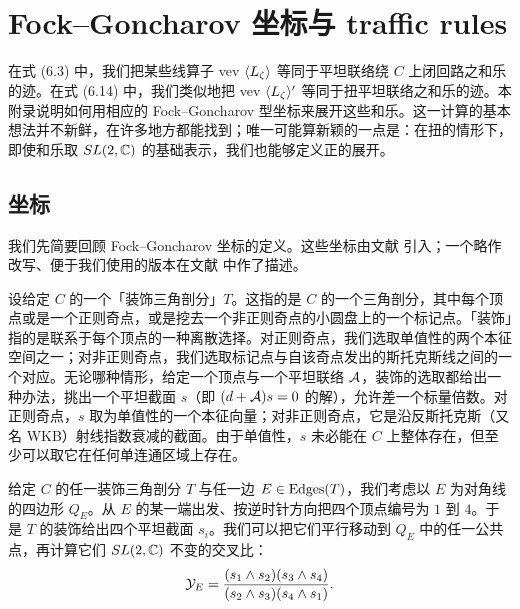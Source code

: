 
\section{Fock--Goncharov 坐标与 traffic rules}

在式 (6.3)%
中，我们把某些线算子 vev $\langle L_\zeta \rangle$ 等同于平坦联络绕 $C$ 上闭回路之和乐的迹。在式 (6.14)%
中，我们类似地把 vev $\langle L_\zeta \rangle'$ 等同于扭平坦联络之和乐的迹。本附录说明如何用相应的 Fock--Goncharov 型坐标来展开这些和乐。这一计算的基本想法并不新鲜，在许多地方都能找到；唯一可能算新颖的一点是：在扭的情形下，即使和乐取 $SL(2,\mathbb{C})$ 的基础表示，我们也能够定义正的展开。

\subsection{坐标}\label{app:fgcoords}

我们先简要回顾 Fock--Goncharov 坐标的定义。这些坐标由文献 \cite{MR2233852} 引入；一个略作改写、便于我们使用的版本在文献 \cite{Gaiotto:2009hg} 中作了描述。

设给定 $C$ 的一个「装饰三角剖分」$T$。这指的是 $C$ 的一个三角剖分，其中每个顶点或是一个正则奇点，或是挖去一个非正则奇点的小圆盘上的一个标记点。「装饰」指的是联系于每个顶点的一种离散选择。对正则奇点，我们选取单值性的两个本征空间之一；对非正则奇点，我们选取标记点与自该奇点发出的斯托克斯线之间的一个对应。无论哪种情形，给定一个顶点与一个平坦联络 $\mathcal{A}$，装饰的选取都给出一种办法，挑出一个平坦截面 $s$（即 $(d+\mathcal{A})s=0$ 的解），允许差一个标量倍数。对正则奇点，$s$ 取为单值性的一个本征向量；对非正则奇点，它是沿反斯托克斯（又名 WKB）射线指数衰减的截面。由于单值性，$s$ 未必能在 $C$ 上整体存在，但至少可以取它在任何单连通区域上存在。

给定 $C$ 的任一装饰三角剖分 $T$ 与任一边 $E\in\operatorname{Edges}(T)$，我们考虑以 $E$ 为对角线的四边形 $Q_E$。从 $E$ 的某一端出发、按逆时针方向把四个顶点编号为 $1$ 到 $4$。于是 $T$ 的装饰给出四个平坦截面 $s_i$。我们可以把它们平行移动到 $Q_E$ 中的任一公共点，再计算它们 $SL(2,\mathbb{C})$ 不变的交叉比：
\begin{equation} \label{eq:def-Y}
\mathcal{Y}_E = \frac{(s_1 \wedge s_2) (s_3 \wedge s_4)}{(s_2 \wedge s_3)(s_4 \wedge s_1)}.
\end{equation}

